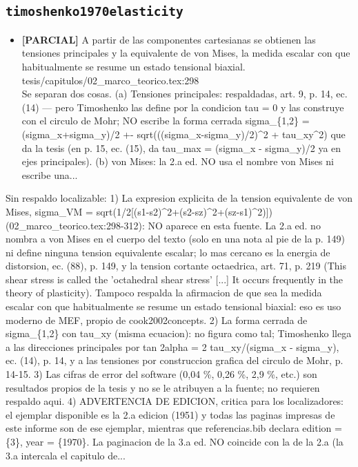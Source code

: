 \documentclass[11pt,a4paper]{article}
\newcommand{\campo}[1]{\textcolor{gris}{\footnotesize #1}}
\begin{document}
\subsection{\texttt{timoshenko1970elasticity}}
\begin{itemize}\small
\item \textbf{[PARCIAL]} A partir de las componentes cartesianas se obtienen las tensiones principales y la equivalente de von Mises, la medida escalar con que habitualmente se resume un estado tensional biaxial. tesis/capitulos/02\_marco\_teorico.tex:298
\\ \campo{Se separan dos cosas. (a) Tensiones principales: respaldadas, art. 9, p. 14, ec. (14) --- pero Timoshenko las define por la condicion tau = 0 y las construye con el circulo de Mohr; NO escribe la forma cerrada sigma\_\{1,2\} = (sigma\_x+sigma\_y)/2 +- sqrt(((sigma\_x-sigma\_y)/2)\textasciicircum{}2 + tau\_xy\textasciicircum{}2) que da la tesis (en p. 15, ec. (15), da tau\_max = (sigma\_x - sigma\_y)/2 ya en ejes principales). (b) von Mises: la 2.a ed. NO usa el nombre \textquotedbl{}von Mises\textquotedbl{} ni escribe una...}
\end{itemize}
{\small\campo{Sin respaldo localizable:} 1) La expresion explicita de la tension equivalente de von Mises, sigma\_VM = sqrt(1/2[(s1-s2)\textasciicircum{}2+(s2-sz)\textasciicircum{}2+(sz-s1)\textasciicircum{}2)]) (02\_marco\_teorico.tex:298-312): NO aparece en esta fuente. La 2.a ed. no nombra a von Mises en el cuerpo del texto (solo en una nota al pie de la p. 149) ni define ninguna tension equivalente escalar; lo mas cercano es la energia de distorsion, ec. (88), p. 149, y la tension cortante octaedrica, art. 71, p. 219 (\textquotedbl{}This shear stress is called the 'octahedral shear stress' [...] It occurs frequently in the theory of plasticity\textquotedbl{}). Tampoco respalda la afirmacion de que sea \textquotedbl{}la medida escalar con que habitualmente se resume un estado tensional biaxial\textquotedbl{}: eso es uso moderno de MEF, propio de cook2002concepts. 2) La forma cerrada de sigma\_\{1,2\} con tau\_xy (misma ecuacion): no figura como tal; Timoshenko llega a las direcciones principales por tan 2alpha = 2 tau\_xy/(sigma\_x - sigma\_y), ec. (14), p. 14, y a las tensiones por construccion grafica del circulo de Mohr, p. 14-15. 3) Las cifras de error del software (0,04 \%, 0,26 \%, 2,9 \%, etc.) son resultados propios de la tesis y no se le atribuyen a la fuente; no requieren respaldo aqui. 4) ADVERTENCIA DE EDICION, critica para los localizadores: el ejemplar disponible es la 2.a edicion (1951) y todas las paginas impresas de este informe son de ese ejemplar, mientras que referencias.bib declara edition = \{3\}, year = \{1970\}. La paginacion de la 3.a ed. NO coincide con la de la 2.a (la 3.a intercala el capitulo de...\par}
\end{document}
